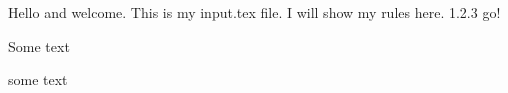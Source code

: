 Hello and welcome.
This is my input.tex file.
I will show my rules here.
1.2.3 go!
\begin{chapter}
    \item Some text
\end{chapter}

\item some text

